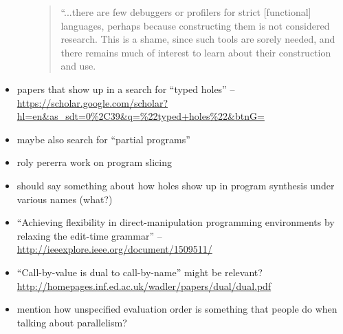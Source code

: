 \begin{itemize}
\begin{itemize}
			\begin{quote}
			“...there are few debuggers or
profilers for strict [functional] languages, perhaps because constructing them is not considered
research. This is a shame, since such tools are sorely needed, and there remains much of
interest to learn about their construction and use.
\end{quote}
		\end{itemize}
	\item papers that show up in a search for ``typed holes'' -- \url{https://scholar.google.com/scholar?hl=en&as_sdt=0%2C39&q=%22typed+holes%22&btnG=}
	\item maybe also search for ``partial programs'' 
	\item roly pererra work on program slicing
	\item should say something about how holes show up in program synthesis under various names (what?) 
	\item ``Achieving flexibility in direct-manipulation programming environments by relaxing the edit-time grammar'' -- \url{http://ieeexplore.ieee.org/document/1509511/}
	\item ``Call-by-value is dual to call-by-name'' might be relevant? \url{http://homepages.inf.ed.ac.uk/wadler/papers/dual/dual.pdf}
	\item mention how unspecified evaluation order is something that people do when talking about parallelism?
\end{itemize}
